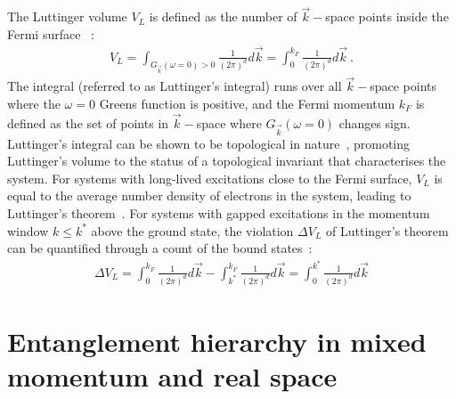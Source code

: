 The Luttinger volume \(V_L\) is defined as the number of \(\vec k-\)space points inside the Fermi surface~\cite{luttinger1960fermi,luttinger1960ground} :
\begin{equation}\label{Luttvol}\begin{aligned}
	V_L = \int_{G_{\vec k}(\omega=0) > 0} \frac{1}{\left( 2\pi \right) ^d} d\vec k = \int_0^{k_F}\frac{1}{\left( 2\pi \right) ^d} d\vec k~.
\end{aligned}\end{equation}
The integral (referred to as Luttinger's integral) runs over all \(\vec k-\)space points where the \(\omega=0\) Greens function is positive, and the Fermi momentum \(k_F\) is defined as the set of points in \(\vec k-\)space where \(G_{\vec k}(\omega=0)\) changes sign. Luttinger's integral can be shown to be topological in nature~\cite{seki2017topological,oshikawa2000topological}, promoting Luttinger's volume to the status of a topological invariant that characterises the system. For systems with long-lived excitations close to the Fermi surface, \(V_L\) is equal to the average number density of electrons in the system, leading to Luttinger's theorem~\cite{luttinger1960fermi,luttinger1960ground,Heath_2020}.  For systems with gapped excitations in the momentum window \(k \leq k^*\) above the ground state, the violation \(\Delta V_L\) of Luttinger's theorem can be quantified through a count of the bound states~\cite{anirbanurg1}:
\begin{equation}\begin{aligned}\label{LT-violation}
	\Delta V_L = \int_0^{k_F} \frac{1}{\left( 2\pi \right) ^d} d\vec k - \int_{k^*}^{k_F} \frac{1}{\left( 2\pi \right) ^d} d\vec k = \int_{0}^{k^*} \frac{1}{\left( 2\pi \right) ^d} d\vec k
\end{aligned}\end{equation}


\section{Entanglement hierarchy in mixed momentum and real space}
\label{hierarchy}

